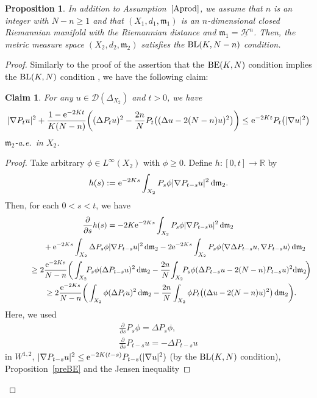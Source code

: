 \documentclass[10pt,a4paper]{amsart}
\numberwithin{equation}{section}
\newtheorem{Prop}[Thm]{Proposition}
\newtheorem{Clm}[Thm]{Claim}
\theoremstyle{definition}
\newcommand{\R}{\mathbb{R}}
\newcommand{\mf}{\mathfrak{m}}
\newcommand{\BE}{{\rm BE}}
\newcommand{\BL}{{\rm BL}}
\newcommand{\nHa}{\underline{\mathcal{H}}}
\newcommand{\D}{\mathcal{D}}
\begin{document}
\begin{Prop}\label{blN-n}
In addition to Assumption~$\ref{Aprod}$, we assume that $n$ is an integer with $N-n\geq 1$ and that $(X_1,d_1,\mf_1)$ is an $n$-dimensional closed Riemannian manifold with the Riemannian distance and $\mf_1=\nHa^n$.
Then, the metric measure space $(X_2,d_2,\mf_2)$ satisfies the $\BL(K,N-n)$ condition.
\end{Prop}
\begin{proof}
Similarly to the proof of the assertion that the $\BE(K,N)$ condition implies the $\BL(K,N)$ condition \cite[Proposition~4.9]{EKS}, we have the following claim:
\begin{Clm}\label{blmod}
For any $u\in\D(\Delta_{X_2})$ and $t>0$, we have
\[
|\nabla P_t u|^2+\frac{1-{\rm e}^{-2Kt}}{K(N-n)}\bigg((\Delta P_t u)^2-\frac{2n}{N}P_t\big((\Delta u-2(N-n)u)^2\big)\bigg)\leq {\rm e}^{-2Kt}P_t\big(|\nabla u|^2\big)
\]
$\mf_2$-a.e.\ in $X_2$.
\end{Clm}
\begin{proof}
Take arbitrary $\phi\in L^\infty(X_2)$ with $\phi\geq 0$.
Define $h\colon [0,t]\to \R$ by
\[
h(s):={\rm e}^{-2Ks} \int_{X_2} P_s\phi|\nabla P_{t-s} u|^2\,{\rm d}\mf_2.
\]
Then, for each $0<s<t$, we have
\begin{gather*}
\frac{\partial}{\partial s} h(s)
=-2K {\rm e}^{-2 K s}\int_{X_2} P_s \phi|\nabla P_{t-s} u|^2\,{\rm d}\mf_2
\\ \hphantom{\frac{\partial}{\partial s} h(s)=}
{}+{\rm e}^{-2K s}\int_{X_2} \Delta P_s \phi |\nabla P_{t-s} u|^2\,{\rm d}\mf_2
-2 {\rm e}^{-2K s}\int_{X_2} P_s\phi\langle\nabla \Delta P_{t-s} u,\nabla P_{t-s}u \rangle\,{\rm d}\mf_2
\\ \hphantom{\frac{\partial}{\partial s} h(s)}
{}\geq 2 \frac{{\rm e}^{-2K s}}{N-n}\bigg(\int_{X_2}\!\!P_s \phi (\Delta P_{t-s} u)^2\,{\rm d}\mf_2
-\frac{2n}{N}\!\int_{X_2}\!\!P_s \phi (\Delta P_{t-s} u-2(N-n)P_{t-s} u)^2{\rm d}\mf_2 \!\bigg)
\\ \hphantom{\frac{\partial}{\partial s} h(s)}
{}\geq 2 \frac{{\rm e}^{-2K s}}{N-n}\bigg(\int_{X_2}\phi (\Delta P_{t} u)^2\,{\rm d}\mf_2
-\frac{2n}{N}\int_{X_2} \phi P_t\big((\Delta u-2(N-n)u)^2\big)\,{\rm d}\mf_2 \bigg).
\end{gather*}
Here, we used
\begin{gather*}
\frac{\partial}{\partial s} P_s \phi=\Delta P_s \phi,
\\
\frac{\partial }{\partial s}P_{t-s} u= -\Delta P_{t-s} u
\end{gather*}
in $W^{1,2}$, $|\nabla P_{t-s} u|^2\leq {\rm e}^{-2K (t-s)}P_{t-s}(|\nabla u|^2)$ (by the $\BL(K,N)$ condition), Proposition~\ref{preBE} and the Jensen inequality

\end{proof}
\end{proof}
\end{document}
